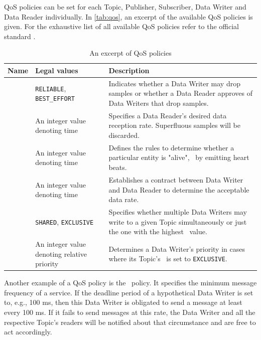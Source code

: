 QoS policies can be set for each Topic, Publisher, Subscriber, Data Writer and Data Reader individually. 
In \autoref{tab:qos}, an excerpt of the available QoS policies is given. For the exhaustive list of all available QoS policies refer to the official standard \cite{dds-1.4-standard}.

%
%
%
%
%
\begin{table}[htpb]
  \caption[An excerpt of DDS QoS policies]{An excerpt of QoS policies}\label{tab:qos}
  \centering
  \begin{tabular}{p{} p{}  p{}}
    \toprule
      \textbf{Name} & \textbf{Legal values} & \textbf{Description} \\
    \midrule
    	\reliability  & \texttt{RELIABLE}, \texttt{BEST\_EFFORT} & Indicates whether a Data Writer may drop samples or whether a Data Reader approves of Data Writers that drop samples.\\
    	\tbf  & An integer value denoting time & Specifies a Data Reader's desired data reception rate. Superfluous samples will be discarded.\\
    	\liveliness  & An integer value denoting time & Defines the rules to determine whether a particular entity is "alive", \eg\ by emitting heart beats. \\
    	\deadline  & An integer value denoting time & Establishes a contract between Data Writer and Data Reader to determine the acceptable data rate. \\
    	\ownership  & \texttt{SHARED}, \texttt{EXCLUSIVE} & Specifies whether multiple Data Writers may write to a given Topic simultaneously or just the one with the highest \ostrength\  value.\\
    	\ostrength  & An integer value denoting relative priority & Determines a Data Writer's priority in cases where its Topic's \ownership\ is set to \texttt{EXCLUSIVE}. \\
    \bottomrule
  \end{tabular}
\end{table}
%
%
%
%
%

Another example of a QoS policy is the \deadline\ policy. It specifies the minimum message frequency of a service. If the deadline period of a hypothetical Data Writer is set to, e.g., 100 ms, then this Data Writer is obligated to send a message at least every 100 ms. If it fails to send messages at this rate, the Data Writer and all the respective Topic's readers will be notified about that circumstance and are free to act accordingly.

